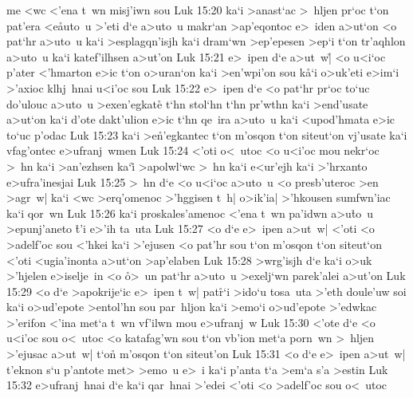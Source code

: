 me
<wc
<'ena
t~wn
misj'iwn
sou\bibvsend
\vs Luk 15:20
ka`i
>anast`ac
>~hljen
pr`oc
t`on
pat'era
<e\r{a}uto~u
>'eti
d`e
a>uto~u
makr`an
>ap'eqontoc
e>~iden
a>ut`on
<o
pat`hr
a>uto~u
ka`i
>esplagqn'isjh
ka`i
dram`wn
>ep'epesen
>ep`i
t`on
tr'aqhlon
a>uto~u
ka`i
katef'ilhsen
a>ut'on\bibvsend
\vs Luk 15:21
e>~ipen
d`e
a>ut~w|\r{}
<o
u<i`oc
p'ater
<'hmarton
e>ic
t`on
o>uran`on
ka`i
>en'wpi'on
sou
k\r{a}`i
o>uk'eti
e>im`i
>'axioc
klhj~hnai
u<i'oc
sou\bibvsend
\vs Luk 15:22
e>~ipen
d`e
<o
pat`hr
pr`oc
to`uc
do'ulouc
a>uto~u
>exen'egkate\r{}
t`hn
stol`hn
t`hn
pr'wthn
ka`i
>end'usate
a>ut`on
ka`i
d'ote
dakt'ulion
e>ic
t`hn
qe~ira
a>uto~u
ka`i
<upod'hmata
e>ic
to`uc
p'odac\bibvsend
\vs Luk 15:23
ka`i
>e\r{n}'egkantec
t`on
m'osqon
t`on
siteut`on
vj'usate
ka`i
vfag'ontec
e>ufranj~wmen\bibvsend
\vs Luk 15:24
<'oti
o<~utoc
<o
u<i'oc
mou
nekr`oc
>~hn
ka`i
>an'ezhsen
ka`i\r{}
>apolwl`wc
>~hn
ka`i
e<ur'ejh
ka`i
>'hrxanto
e>ufra'inesjai\bibvsend
\vs Luk 15:25
>~hn
d`e
<o
u<i`oc
a>uto~u
<o
presb'uteroc
>en
>agr~w|
ka`i
<wc
>erq'omenoc
>'hggisen
t~h|
o>ik'ia|
>'hkousen
sumfwn'iac
ka`i
qor~wn\bibvsend
\vs Luk 15:26
ka`i
proskales'amenoc
<'ena
t~wn
pa'idwn
a>u\r{t}o~u
>epunj'aneto
\r{t}'i
e>'ih
ta~uta\bibvsend
\vs Luk 15:27
<o
d`e
e>~ipen
a>ut~w|
<'oti
<o
>adelf'oc
sou
<'hkei
ka`i
>'ejusen
<o
pat'hr
sou
t`on
m'osqon
t`on
siteut`on
<'oti
<ugia'inonta
a>ut`on
>ap'elaben\bibvsend
\vs Luk 15:28
>wrg'isjh
d`e
ka`i
o>uk
>'hjelen
e>iselje~in
<o
\r{o}>~un
pat`hr
a>uto~u
>exelj`wn
parek'alei
a>ut'on\bibvsend
\vs Luk 15:29
<o
d`e
>apokrije`ic
e>~ipen
t~w|
pat\r{r}`i
>ido`u
tosa~uta
>'eth
doule'uw
soi
ka`i
o>ud'epote
>entol'hn
sou
par~hljon
ka`i
>emo`i
o>ud'epote
>'edwkac
>'erifon
<'ina
met`a
t~wn
vf'ilwn
mou
e>ufranj~w\bibvsend
\vs Luk 15:30
<'ote
d`e
<o
u<i'oc
sou
o<~utoc
<o
katafag'wn
sou
t`on
vb'ion
met`a
porn~wn
>~hljen
>'ejusac
a>ut~w|
t`on\r{}
m'osqon
t`on
siteut'on\bibvsend
\vs Luk 15:31
<o
d`e
e>~ipen
a>ut~w|
t'eknon
s`u
p'antote
met>
>emo~u
e>~i
ka`i
p'anta
t`a
>em`a
s'a
>estin\bibvsend
\vs Luk 15:32
e>ufranj~hnai
d`e
ka`i
qar~hnai
>'edei
<'oti
<o
>adelf'oc
sou
o<~utoc

